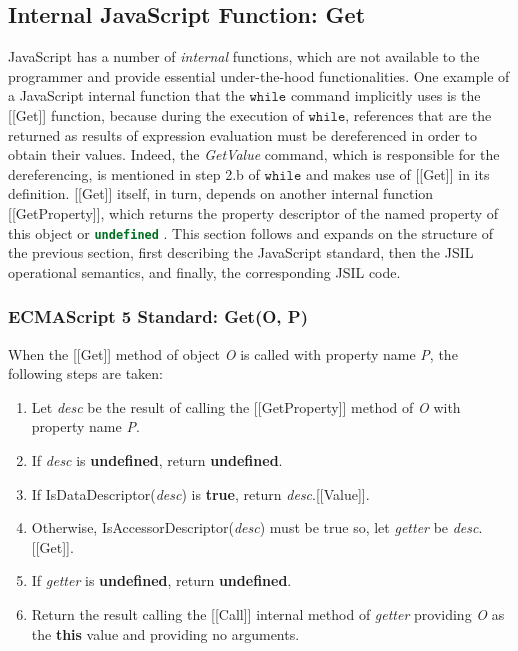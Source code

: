 \documentclass[a4paper,11pt,twoside]{report}
\def\jsinline{\lstinline[language=JavaScript, basicstyle=\small]}%\end{lstlisting}
\begin{document}
\subsection{Internal JavaScript Function: Get}\label{sec:get}
JavaScript has a number of {\em internal} functions, which are not available to the programmer and provide essential under-the-hood functionalities. One example of a JavaScript internal function that the $\mathtt{while}$ command implicitly uses is the [[Get]] function, because during the execution of $\mathtt{while}$, references that are the returned as results of expression evaluation must be dereferenced in order to obtain their values. Indeed, the \textit{GetValue} command, which is responsible for the dereferencing, is mentioned in step 2.b of $\mathtt{while}$ and makes use of [[Get]] in its definition. [[Get]] itself, in turn, depends on another internal function [[GetProperty]], which returns the property descriptor of the named property of this object or \jsinline|undefined| \cite{EcmaScript}. This section follows and expands on the structure of the previous section, first describing the JavaScript standard, then the JSIL operational semantics, and finally, the corresponding JSIL code.

\subsubsection{ECMAScript 5 Standard: Get(O, P)}\label{sec:getstandard}
When the [[Get]] method of object \textit{O} is called with property name \textit{P}, the following steps are taken:
\begin{enumerate}
\setlength{\itemsep}{0pt}
\item Let \textit{desc} be the result of calling the [[GetProperty]] method of \textit{O} with property name \textit{P}.
\item If \textit{desc} is \textbf{undefined}, return \textbf{undefined}.
\item If IsDataDescriptor(\textit{desc}) is \textbf{true}, return \textit{desc}.[[Value]].
\item Otherwise, IsAccessorDescriptor(\textit{desc}) must be true so, let \textit{getter} be \textit{desc}.[[Get]].
\item If \textit{getter} is \textbf{undefined}, return \textbf{undefined}.
\item Return the result calling the [[Call]] internal method of \textit{getter} providing \textit{O} as the \textbf{this} value and providing no arguments.
\end{enumerate}
\end{document}
